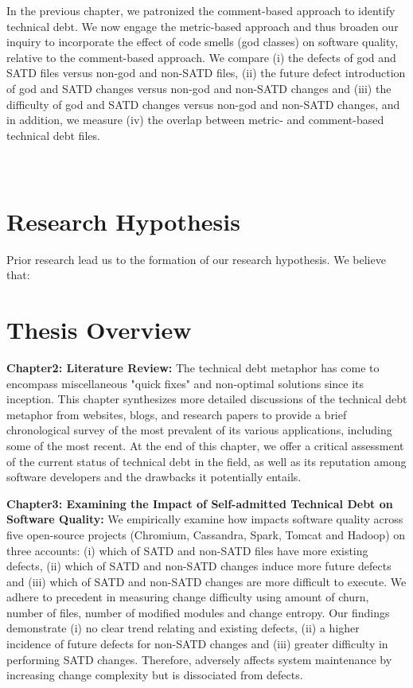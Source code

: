 In the previous chapter, we patronized the comment-based approach to identify technical debt. We now engage the metric-based approach and thus broaden our inquiry to incorporate the effect of code smells (god classes) on software quality, relative to the comment-based approach. We compare (i) the defects of god and SATD files versus non-god and non-SATD files, (ii) the future defect introduction of god and SATD changes versus non-god and non-SATD changes and (iii) the difficulty of god and SATD changes versus non-god and non-SATD changes, and in addition, we measure (iv) the overlap between metric- and comment-based technical debt files.\\ \\ \\




\section{Research Hypothesis}
Prior research lead us to the formation of our research hypothesis. We believe that:


\section{Thesis Overview}

\textbf{Chapter2: Literature Review:} The technical debt metaphor has come to encompass miscellaneous "quick fixes" and non-optimal solutions since its inception.  This chapter synthesizes more detailed discussions of the technical debt metaphor from websites, blogs, and research papers to provide a brief chronological survey of the most prevalent of its various applications, including some of the most recent.  At the end of this chapter, we offer a critical assessment of the current status of technical debt in the field, as well as its reputation among software developers and the drawbacks it potentially entails.

\textbf{Chapter3: Examining the Impact of Self-admitted Technical Debt on Software Quality:} We empirically examine how \SATD impacts software quality across five open-source projects (Chromium, Cassandra, Spark, Tomcat and Hadoop) on three accounts: (i) which of SATD and non-SATD files have more existing defects, (ii) which of SATD and non-SATD changes induce more future defects and (iii) which of SATD and non-SATD changes are more difficult to execute. We adhere to precedent in measuring change difficulty using amount of churn, number of files, number of modified modules and change entropy. Our findings demonstrate (i) no clear trend relating \SATD and existing defects, (ii) a higher incidence of future defects for non-SATD changes and (iii) greater difficulty in performing SATD changes. Therefore, \SATD adversely affects system maintenance by increasing change complexity but is dissociated from defects.


